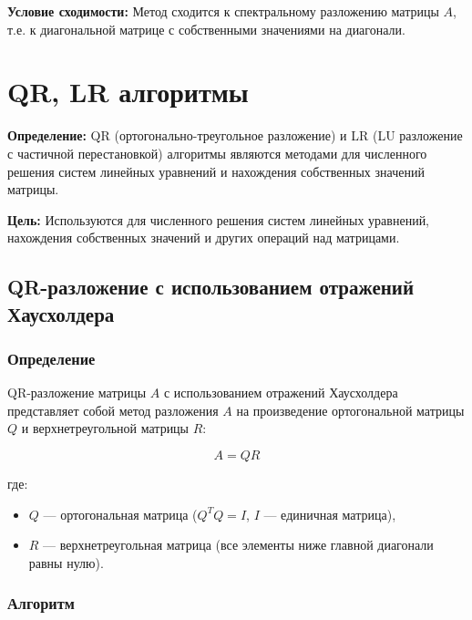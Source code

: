 \documentclass{article}
\begin{document}
\textbf{Условие сходимости:} Метод сходится к спектральному разложению матрицы \( A \), т.е. к диагональной матрице с собственными значениями на диагонали.

\section{QR, LR алгоритмы}

\textbf{Определение:} QR (ортогонально-треугольное разложение) и LR (LU разложение с частичной перестановкой) алгоритмы являются методами для численного решения систем линейных уравнений и нахождения собственных значений матрицы.

\textbf{Цель:} Используются для численного решения систем линейных уравнений, нахождения собственных значений и других операций над матрицами.

\subsection{QR-разложение с использованием отражений Хаусхолдера}

\subsubsection{Определение}

QR-разложение матрицы \( A \) с использованием отражений Хаусхолдера представляет собой метод разложения \( A \) на произведение ортогональной матрицы \( Q \) и верхнетреугольной матрицы \( R \):

\[ A = QR \]

где:
\begin{itemize}
  \item \( Q \) — ортогональная матрица (\( Q^T Q = I \), \( I \) — единичная матрица),
  \item \( R \) — верхнетреугольная матрица (все элементы ниже главной диагонали равны нулю).
\end{itemize}

\subsubsection{Алгоритм}
\end{document}
